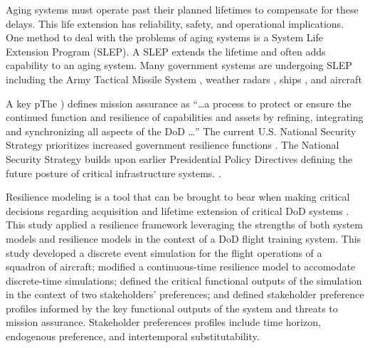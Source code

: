 \documentclass[preprint,12pt]{elsarticle}
\begin{document}
Aging systems must operate past
their planned lifetimes to compensate for these delays. This life extension has
reliability, safety, and operational implications. One method to deal
with the problems of aging systems is a System Life Extension
Program (SLEP). A SLEP extends the lifetime and often adds capability
to an aging system. Many government systems are undergoing SLEP including the Army
Tactical Missile System \cite{DOTE2017,zacks2015}, weather radars
\cite{ROC2018}, ships 
\cite{eckstein2018,NAVSEA2018}, and aircraft
\cite{Lockheed2017,Garbarino2018,Tirpak2015,jennings2018}

A key pThe ) defines mission assurance as ``\ldots a process to 
protect or ensure the continued function and resilience of
capabilities and assets by refining, integrating and synchronizing all
aspects of the DoD \ldots'' \cite{DepartmentofDefense2016a} The
current U.S. National Security  
Strategy prioritizes increased government resilience functions
\cite{Trump2017}. The National Security Strategy builds upon
earlier Presidential Policy Directives defining the future posture of
critical infrastructure systems. \cite{PPD8,PPD21}. 

Resilience modeling is a tool that can be brought to bear when making 
critical decisions regarding acquisition and lifetime extension of
critical DoD systems \cite{Ayyub2014a,Ayyub2015,Emanuel2017,Emanuel2018}. 
This study applied a resilience framework leveraging the strengths of both system
models and resilience models 
in the context of
a DoD flight training system. This study developed a
discrete event simulation for the flight operations of a squadron of
aircraft; modified a continuous-time resilience model \cite{Emanuel2018} to accomodate discrete-time simulations;
defined the critical functional outputs of the simulation
in the context of two stakeholders' preferences; and defined
stakeholder preference profiles informed by the key functional outputs
of the system and threats to mission assurance. Stakeholder
preferences profiles include
time horizon, endogenous preference, and intertemporal
substitutability.


\end{document}
